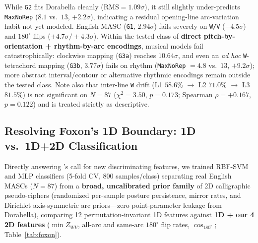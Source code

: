 \documentclass[10pt,a4paper,twocolumn]{article}
\newcommand{\code}[1]{\texttt{\small #1}}
\begin{document}
While \code{G2} fits Dorabella cleanly ($\mathrm{RMS}=1.09\sigma$), it still slightly under-predicts \code{MaxNoRep} ($8.1$ vs.\ $13$, $+2.2\sigma$), indicating a residual opening-line arc-variation habit not yet modeled. English MASC (\code{G1}, $2.94\sigma$) fails severely on \code{W/V} ($-4.5\sigma$) and $180^\circ$ flips ($+4.7\sigma/+4.3\sigma$). Within the tested class of \textbf{direct pitch-by-orientation + rhythm-by-arc encodings}, musical models fail catastrophically: clockwise mapping (\code{G3a}) reaches $10.64\sigma$, and even an \emph{ad hoc} \code{W}-tetrachord mapping (\code{G3b}, $3.77\sigma$) fails on rhythm (\code{MaxNoRep} $= 4.8$ vs.\ $13$, $+9.2\sigma$); more abstract interval/contour or alternative rhythmic encodings remain outside the tested class. Note also that inter-line \code{W} drift (L1 $58.6\%$ $\to$ L2 $71.0\%$ $\to$ L3 $81.5\%$) is not significant on $N=87$ ($\chi^2 = 3.50$, $p = 0.173$; Spearman $\rho = +0.167$, $p = 0.122$) and is treated strictly as descriptive.

\subsection{Resolving Foxon's 1D Boundary: 1D vs.\ 1D+2D Classification}
Directly answering \citet{foxon2025ml}'s call for new discriminating features, we trained RBF-SVM and MLP classifiers (5-fold CV, 800 samples/class) separating real English MASCs ($N=87$) from a \textbf{broad, uncalibrated prior family} of 2D calligraphic pseudo-ciphers (randomized per-sample posture persistence, mirror rates, and Dirichlet axis-symmetric arc priors---zero point-parameter leakage from Dorabella), comparing 12 permutation-invariant 1D features against \textbf{1D + our 4 2D features} ($\min Z_{WV}$, all-arc and same-arc $180^\circ$ flip rates, $\cos_{180^\circ}$; Table~\ref{tab:foxon}).
\end{document}
